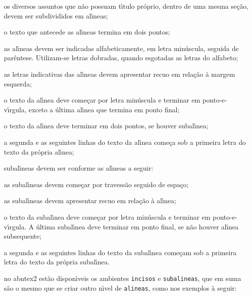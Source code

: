 \begin{alineas}%
\item os diversos assuntos que n\~ao possuam t\'{\i}tulo pr\'oprio, dentro de uma mesma se\c{c}\~ao, devem ser subdivididos em al\'{\i}neas;
\item o texto que antecede as al\'{\i}neas termina em dois pontos;
\item as al\'{\i}neas devem ser indicadas alfabeticamente, em letra min\'uscula, seguida de par\^entese. Utilizam-se letras dobradas, quando esgotadas as letras do alfabeto;
\item as letras indicativas das al\'{\i}neas devem apresentar recuo em rela\c{c}\~ao \`a margem esquerda;
\item o texto da al\'{\i}nea deve come\c{c}ar por letra min\'uscula e terminar em ponto-e-v\'{\i}rgula, exceto a \'ultima al\'{\i}nea que termina em ponto final;
\item o texto da al\'{\i}nea deve terminar em dois pontos, se houver subal\'{\i}nea;
\item a segunda e as seguintes linhas do texto da al\'{\i}nea come\c{c}a sob a primeira letra do texto da pr\'opria al\'{\i}nea;
\item subal\'{\i}neas \cite[subse\c{c}\~ao~4.3]{NBR6024:2012} devem ser conforme as al\'{\i}neas a seguir:
\begin{alineas}%
\item as subal\'{\i}neas devem come\c{c}ar por travess\~ao seguido de espa\c{c}o;
\item as subal\'{\i}neas devem apresentar recuo em rela\c{c}\~ao \`a al\'{\i}nea;
\item o texto da subal\'{\i}nea deve come\c{c}ar por letra min\'uscula e terminar em ponto-e-v\'{\i}rgula. A \'ultima subal\'{\i}nea deve terminar em ponto final, se n\~ao houver al\'{\i}nea subsequente;
\item a segunda e as seguintes linhas do texto da subal\'{\i}nea come\c{c}am sob a primeira letra do texto da pr\'opria subal\'{\i}nea.
\end{alineas}
\item no \gls{abntex2} est\~ao dispon\'{\i}veis os ambientes \texttt{incisos} e \texttt{subalineas}, que em suma s\~ao o mesmo que se criar outro n\'{\i}vel de \texttt{alineas}, como nos exemplos \`a seguir:
\begin{incisos}%

\end{incisos}
\end{alineas}
